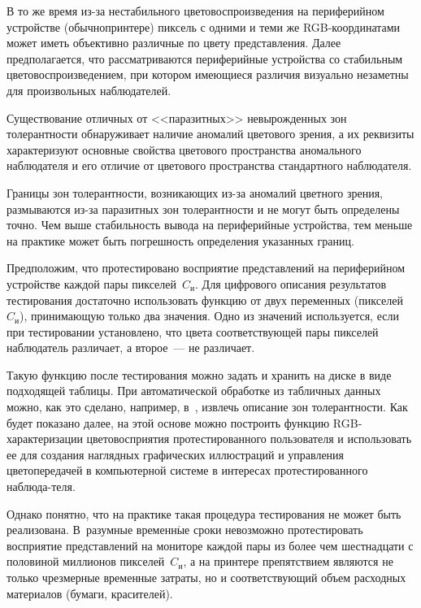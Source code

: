 \begin{multicols}{2}
  В то же время из-за нестабильного цветовоспроизведения на периферийном 
устройстве (обычно\linebreak принтере) пиксель с одними и теми же 
  RGB-ко\-ор\-ди\-на\-та\-ми может иметь объективно различные по цвету 
представления. Далее предполагается, что рассматриваются периферийные 
устройства со стабильным цветовоспроизведением, при котором имеющиеся 
различия визуально незаметны для произвольных наблюдателей.
  
  Существование отличных от <<паразитных>> невырожденных зон 
толерантности обнаруживает наличие аномалий цветового зрения, а их 
реквизиты характеризуют основные свойства цветового пространства 
аномального наблюдателя и его отличие от цветового пространства 
стандартного наблюдателя. 
  
  Границы зон толерантности, возникающих из-за аномалий цветного зрения, 
размываются из-за паразитных зон толерантности и не могут быть определены 
точно. Чем выше стабильность вывода на периферийные устройства, тем 
меньше на практике может быть погрешность определения указанных границ.
  
  Предположим, что протестировано восприятие представлений на 
периферийном устройстве каж\-дой пары пикселей~$C_{\mathrm{и}}$. Для 
цифрового описания результатов тестирования достаточно использовать 
функцию от двух переменных (пикселей~$C_{\mathrm{и}}$), принимающую 
только два значения. Одно из значений используется, если при тестировании 
установлено, что цвета соответствующей пары пикселей наблюдатель 
различает, а второе~--- не различает. 
  
  Такую функцию после тестирования можно задать и хранить на диске в виде 
подходящей таблицы. При автоматической обработке из табличных данных 
можно, как это сделано, например, в~\cite{7ar}, извлечь описание зон 
толерантности. Как будет показано далее, на этой основе можно построить 
функцию RGB-ха\-рак\-те\-ри\-за\-ции цветовосприятия протестированного 
пользователя и использовать ее для создания наглядных графических 
иллюстраций и управления цветопередачей в компьютерной сис\-те\-ме в 
интересах протестированного наблюда-\linebreak теля.
  
  Однако понятно, что на практике такая процедура тестирования не может 
быть реализована. В~разумные временн$\acute{\mbox{ы}}$е сроки 
невозможно про\-тес\-ти\-ро\-вать восприятие представлений на мониторе каждой 
пары из более чем шестнадцати с половиной миллионов 
пикселей~$C_{\mathrm{и}}$, а на принтере препятствием являются не только 
чрезмерные временные затраты, но и соответствующий объем расходных 
материалов (бумаги, красителей).
  

\end{multicols}
